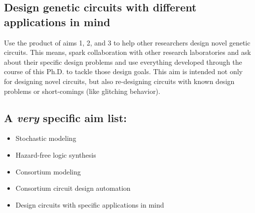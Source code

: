 \documentclass[12pt]{article}
\begin{document}


\subsection[Design genetic circuits with different applications in mind]{\hypertarget{design}{Design} genetic circuits with different applications in mind} \label{design1}

Use the product of aims 1, 2, and 3 to help other researchers design novel genetic circuits. This means, spark collaboration with other research laboratories and ask about their specific design problems and use everything developed through the course of this Ph.D. to tackle those design goals. This aim is intended not only for designing novel circuits, but also re-designing circuits with known design problems or short-comings (like glitching behavior).



\subsection*{A \textit{very} specific aim list:}
\begin{itemize}
	\item Stochastic modeling
	\item Hazard-free logic synthesis
	\item Consortium modeling
	\item Consortium circuit design automation
	\item Design circuits with specific applications in mind
\end{itemize}

\printbibliography
\end{document}
